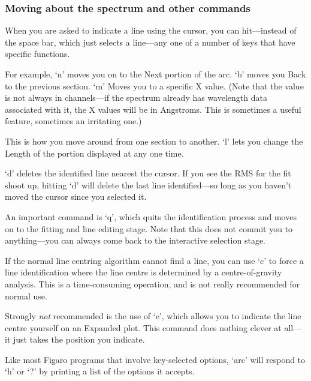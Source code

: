 \documentclass[11pt,twoside]{article}
\newcommand{\latorhtm}[2]{#1}
\newcommand{\latorhtm}[2]{#2}
\begin{document}

\subsubsection{\label{techno10moving}Moving about the spectrum and other commands}

   When you are asked to indicate a line using the cursor, you can
   hit\latorhtm{---}{-}instead of the space bar, which just selects a
   line\latorhtm{---}{-}any one
   of a number of keys that have specific functions.

   For example, `n' moves you on to the Next portion of the arc. `b'
   moves you Back to the previous section.  `m' Moves you to a specific
   X value.  (Note that the value is not always in channels\latorhtm{---}{-}if
   the
   spectrum already has wavelength data associated with it, the X values
   will be in Angstroms.  This is sometimes a useful feature, sometimes
   an irritating one.)

   This is how you move around from one section to another.  `l' lets
   you change the Length of the portion displayed at any one time.

   `d' deletes the identified line nearest the cursor.  If you see the
   RMS for the fit shoot up, hitting `d' will delete the last line
   identified\latorhtm{---}{-}so long as you haven't moved the cursor
   since you selected it.

   An important command is `q', which quits the identification process
   and moves on to the fitting and line editing stage. Note that this
   does not commit you to anything\latorhtm{---}{-}you can always come back
   to the interactive selection stage.

   If the normal line centring algorithm cannot find a line, you can
   use `c' to force a line identification where the line centre is
   determined by a centre-of-gravity analysis.  This is a time-consuming
   operation, and is not really recommended for normal use.

   Strongly {\em not\/}
   recommended is the use of `e', which allows you to indicate the line
   centre yourself on an Expanded plot.  This command does nothing
   clever at all\latorhtm{---}{-}it just takes the position you indicate.

   Like most Figaro programs that involve key-selected options, `arc'
   will respond to `h' or `?' by printing a list of the options it
   accepts.
\end{document}
